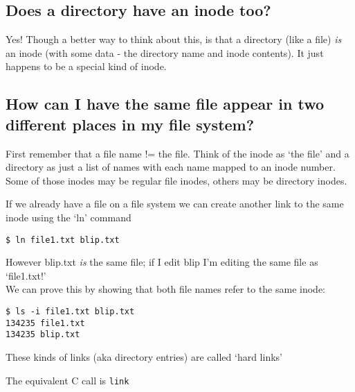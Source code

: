 \subsection{Does a directory have an inode
too?}\label{does-a-directory-have-an-inode-too}

Yes! Though a better way to think about this, is that a directory (like
a file) \emph{is} an inode (with some data - the directory name and
inode contents). It just happens to be a special kind of inode.

\subsection{How can I have the same file appear in two different places
in my file
system?}\label{how-can-i-have-the-same-file-appear-in-two-different-places-in-my-file-system}

First remember that a file name != the file. Think of the inode as `the
file' and a directory as just a list of names with each name mapped to
an inode number. Some of those inodes may be regular file inodes, others
may be directory inodes.

If we already have a file on a file system we can create another link to
the same inode using the `ln' command

\begin{verbatim}
$ ln file1.txt blip.txt
\end{verbatim}

However blip.txt \emph{is} the same file; if I edit blip I'm editing the
same file as `file1.txt!'\\We can prove this by showing that both file
names refer to the same inode:

\begin{verbatim}
$ ls -i file1.txt blip.txt
134235 file1.txt
134235 blip.txt
\end{verbatim}

These kinds of links (aka directory entries) are called `hard links'

The equivalent C call is \texttt{link}

\begin{Shaded}
\begin{Highlighting}[]
    

\NormalTok{, }\NormalTok{);}
\end{Highlighting}
\end{Shaded}

